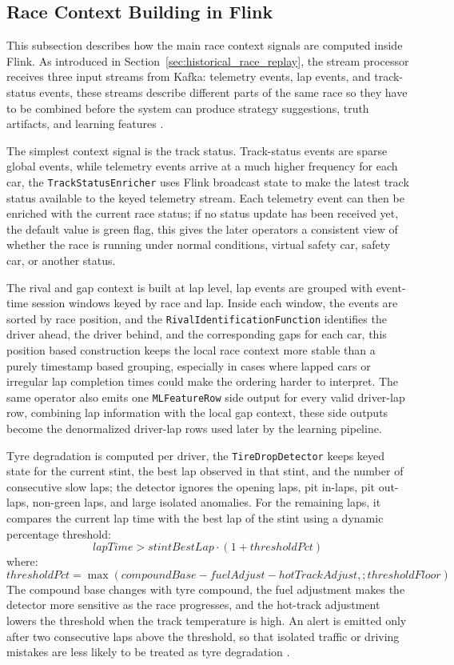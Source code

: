 \subsection{Race Context Building in Flink}
\label{sec:race_context_building}

This subsection describes how the main race context signals are computed inside Flink. As introduced in Section~\ref{sec:historical_race_replay}, the stream processor receives three
input streams from Kafka: telemetry events, lap events, and track-status events, these streams describe different parts of the same race so they have to be combined before the
system can produce strategy suggestions, truth artifacts, and learning features \cite{heilmeier2020race,carrasco2023optimization}.

The simplest context signal is the track status. Track-status events are sparse global events, while telemetry events arrive at a much higher frequency for each car, the
\texttt{TrackStatusEnricher} uses Flink broadcast state to make the latest track status available to the keyed telemetry stream. Each telemetry event can then be enriched
with the current race status; if no status update has been received yet, the default value is green flag, this gives the later operators a consistent view of whether the race
is running under normal conditions, virtual safety car, safety car, or another status.

The rival and gap context is built at lap level, lap events are grouped with event-time session windows keyed by race and lap. Inside each window, the events are sorted by race
position, and the \texttt{RivalIdentificationFunction} identifies the driver ahead, the driver behind, and the corresponding gaps for each car, this position based construction
keeps the local race context more stable than a purely timestamp based grouping, especially in cases where lapped cars or irregular lap completion times could make the ordering
harder to interpret. The same operator also emits one \texttt{MLFeatureRow} side output for every valid driver-lap row, combining lap information with the local gap context,
these side outputs become the denormalized driver-lap rows used later by the learning pipeline.

Tyre degradation is computed per driver, the \texttt{TireDropDetector} keeps keyed state for the current stint, the best lap observed in that stint, and the number of consecutive
slow laps; the detector ignores the opening laps, pit in-laps, pit out-laps, non-green laps, and large isolated anomalies. For the remaining laps, it compares the current lap
time with the best lap of the stint using a dynamic percentage threshold:
\[
    lapTime > stintBestLap \cdot (1 + thresholdPct)
\]
where:
\[
    thresholdPct =
    \max(compoundBase - fuelAdjust - hotTrackAdjust,; thresholdFloor)
\]
The compound base changes with tyre compound, the fuel adjustment makes the detector more sensitive as the race progresses, and the hot-track adjustment lowers the threshold
when the track temperature is high. An alert is emitted only after two consecutive laps above the threshold, so that isolated traffic or driving mistakes are less likely to
be treated as tyre degradation \cite{cappello2025statespace}.

